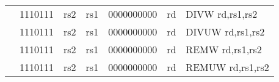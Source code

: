 \begin{table}[p]
\begin{small}
\begin{center}
\begin{tabular}{rcccccccccccl}
&
\multicolumn{2}{|c|}{1110111} &
\multicolumn{1}{c|}{rs2} &
\multicolumn{1}{c|}{rs1} &
\multicolumn{6}{c|}{0000000000} &
\multicolumn{1}{c|}{rd} & DIVW rd,rs1,rs2 \\
\cline{2-12}
  

&
\multicolumn{2}{|c|}{1110111} &
\multicolumn{1}{c|}{rs2} &
\multicolumn{1}{c|}{rs1} &
\multicolumn{6}{c|}{0000000000} &
\multicolumn{1}{c|}{rd} & DIVUW rd,rs1,rs2 \\
\cline{2-12}
  

&
\multicolumn{2}{|c|}{1110111} &
\multicolumn{1}{c|}{rs2} &
\multicolumn{1}{c|}{rs1} &
\multicolumn{6}{c|}{0000000000} &
\multicolumn{1}{c|}{rd} & REMW rd,rs1,rs2 \\
\cline{2-12}
  

&
\multicolumn{2}{|c|}{1110111} &
\multicolumn{1}{c|}{rs2} &
\multicolumn{1}{c|}{rs1} &
\multicolumn{6}{c|}{0000000000} &
\multicolumn{1}{c|}{rd} & REMUW rd,rs1,rs2 \\
\cline{2-12}
  

\end{tabular}
\end{center}
\end{small}

\label{instr-table}
\end{table}
  

\newpage

